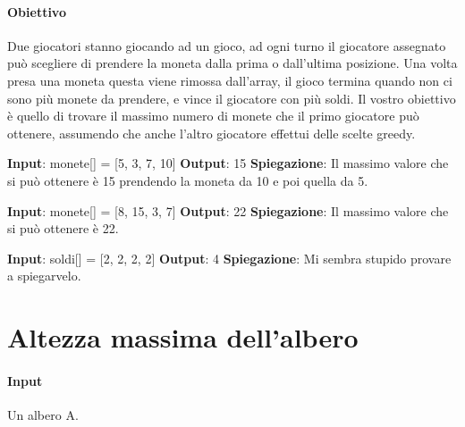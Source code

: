     \paragraph{Obiettivo} Due giocatori stanno giocando ad un gioco, ad ogni turno il giocatore assegnato può scegliere di prendere la moneta dalla prima o dall'ultima posizione. Una volta presa una moneta questa viene rimossa dall'array, il gioco termina quando non ci sono più monete da prendere, e vince il giocatore con più soldi. Il vostro obiettivo è quello di trovare il massimo numero di monete che il primo giocatore può ottenere, assumendo che anche l'altro giocatore effettui delle scelte greedy.
    \begin{esempio}
        \newline
        \textbf{Input}: monete[] = [5, 3, 7, 10]
        \newline
        \textbf{Output}: 15
        \newline
        \textbf{Spiegazione}: Il massimo valore che si può ottenere è 15 prendendo la moneta da 10 e poi quella da 5.
    \end{esempio}
    \begin{esempio}
        \newline
        \textbf{Input}: monete[] = [8, 15, 3, 7]
        \newline
        \textbf{Output}: 22
        \newline
        \textbf{Spiegazione}: Il massimo valore che si può ottenere è 22.
    \end{esempio}
    \begin{esempio}
        \newline
        \textbf{Input}: soldi[] = [2, 2, 2, 2]
        \newline
        \textbf{Output}: 4
        \newline
        \textbf{Spiegazione}: Mi sembra stupido provare a spiegarvelo.
    \end{esempio}

\newpage
\thispagestyle{chapterInit}
\section*{Altezza massima dell'albero}
    \paragraph{Input} Un albero A.
